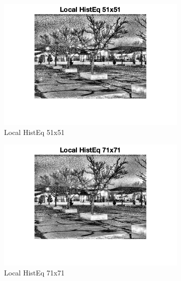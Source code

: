 \documentclass[12pt]{article}
\begin{document}
\begin{figure}[h!]
        \begin{subfigure}[b]{0.3\textwidth}
            \centering
            \includegraphics[width=\textwidth]{../images/LC1_localHistEq_51x51.png}
            \caption{Local HistEq 51x51}
        \end{subfigure}
        \hfill
        \begin{subfigure}[b]{0.3\textwidth}
            \centering
            \includegraphics[width=\textwidth]{../images/LC1_localHistEq_71x71.png}
            \caption{Local HistEq 71x71}
        \end{subfigure}
        \hfill
        \begin{subfigure}[b]{0.3\textwidth}
            \centering

\end{subfigure}
\end{figure}
\end{document}
